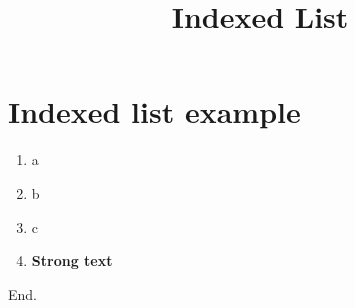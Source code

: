 \documentclass[a4paper,11pt,oneside,openany,report]{jsbook}
\title{Indexed List}
\begin{document}
\maketitle
\chapter{Indexed list example}\label{ch:Indexedlistexample}
\begin{enumerate}
\item a
\item b
\item c
\item \textbf{Strong text}
\end{enumerate}End.
\end{document}
